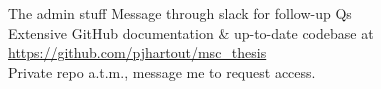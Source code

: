 \documentclass[aspectratio=169, 10pt, dvipsnames]{beamer}
\begin{document}
\begin{frame}[fragile]{The admin stuff}
  Message through slack for follow-up Qs\\
  Extensive GitHub documentation \& up-to-date codebase at \\ \faGithub{}
  \url{https://github.com/pjhartout/msc_thesis}\\
  Private repo a.t.m., message me to request access.
\end{frame}
\end{document}
